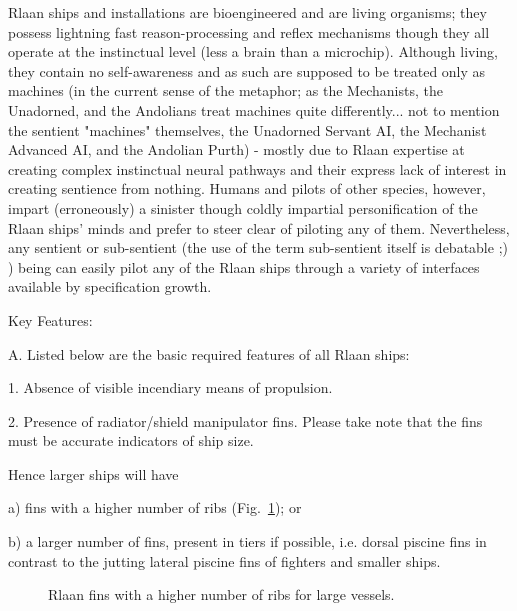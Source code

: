 Rlaan ships and installations are bioengineered and are living organisms; they possess lightning fast reason-processing and reflex mechanisms though they all operate at the instinctual level (less a brain than a microchip). Although living, they contain no self-awareness and as such are supposed to be treated only as machines (in the current sense of the metaphor; as the Mechanists, the Unadorned, and the Andolians treat machines quite differently... not to mention the sentient "machines" themselves, the Unadorned Servant AI, the Mechanist Advanced AI, and the Andolian Purth) - mostly due to Rlaan expertise at creating complex instinctual neural pathways and their express lack of interest in creating sentience from nothing. Humans and pilots of other species, however, impart (erroneously) a sinister though coldly impartial personification of the Rlaan ships' minds and prefer to steer clear of piloting any of them. Nevertheless, any sentient or sub-sentient (the use of the term sub-sentient itself is debatable ;) ) being can easily pilot any of the Rlaan ships through a variety of interfaces available by specification growth.

Key Features:

A. Listed below are the basic required features of all Rlaan ships:

	1. Absence of visible incendiary means of propulsion.
	
	2. Presence of radiator/shield manipulator fins. Please take note that the fins must be 	accurate indicators of ship size. 
	
		Hence larger ships will have
		
		a) fins with a higher number of ribs (Fig.~\ref{fig:rlaan-fins}); or
		
		b) a larger number of fins, present in tiers if possible, i.e. dorsal piscine fins in 		contrast to the jutting lateral piscine fins of fighters and smaller ships.

\begin{figure}
\begin{center}
    \caption{Rlaan fins with a higher number of ribs for large vessels.}
    \label{fig:rlaan-fins}
\end{center}
\end{figure}

